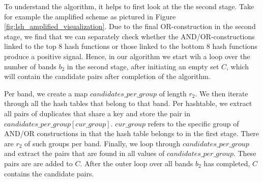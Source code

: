 To understand the algorithm, it helps to first look at the the second stage. Take for example the amplified scheme as pictured in Figure \ref{fig:lsh_amplified_visualization}. Due to the final OR-construction in the second stage, we find that we can separately check whether the AND/OR-constructions linked to the top $8$ hash functions or those linked to the bottom $8$ hash functions produce a positive signal. Hence, in our algorithm we start wih a loop over the number of bands $b_2$ in the second stage, after initiating an empty set $C$, which will contain the candidate pairs after completion of the algorithm.

Per band, we create a map $candidates\_per\_group$ of length $r_2$.  We then iterate through all the hash tables that belong to that band. Per hashtable, we extract all pairs of duplicates that share a key and store the pair in $candidates\_per\_group[cur\_group]$. $cur\_group$ refers to the specific group of AND/OR constructions in that the hash table belongs to in the first stage. There are $r_2$ of such groups per band. Finally, we loop through $candidates\_per\_group$ and extract the pairs that are found in all values of $candidates\_per\_group$. These pairs are are added to $C$. After the outer loop over all bands $b_2$ has completed, $C$ contains the candidate pairs.




